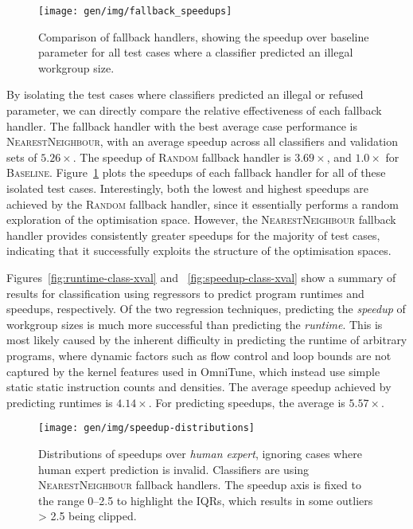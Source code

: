 \begin{figure}
\centering
\texttt{[image: gen/img/fallback\_speedups]}
\caption[Comparison of fallback handler speedups]{%
  Comparison of fallback handlers, showing the speedup over baseline
  parameter for all test cases where a classifier predicted an illegal
  workgroup size.%
}
\label{fig:fallback-speedups}
\end{figure}

By isolating the test cases where classifiers predicted an illegal or
refused parameter, we can directly compare the relative effectiveness
of each fallback handler. The fallback handler with the best average
case performance is \textsc{NearestNeighbour}, with an average speedup
across all classifiers and validation sets of $5.26\times$. The
speedup of \textsc{Random} fallback handler is $3.69\times$, and
$1.0\times$ for \textsc{Baseline}. Figure~\ref{fig:fallback-speedups}
plots the speedups of each fallback handler for all of these isolated
test cases. Interestingly, both the lowest and highest speedups are
achieved by the \textsc{Random} fallback handler, since it essentially
performs a random exploration of the optimisation space. However, the
\textsc{NearestNeighbour} fallback handler provides consistently
greater speedups for the majority of test cases, indicating that it
successfully exploits the structure of the optimisation spaces.

Figures~\ref{fig:runtime-class-xval} and ~\ref{fig:speedup-class-xval}
show a summary of results for classification using regressors to
predict program runtimes and speedups, respectively. Of the two
regression techniques, predicting the \emph{speedup} of workgroup
sizes is much more successful than predicting the \emph{runtime}. This
is most likely caused by the inherent difficulty in predicting the
runtime of arbitrary programs, where dynamic factors such as flow
control and loop bounds are not captured by the kernel features used
in OmniTune, which instead use simple static static instruction counts
and densities. The average speedup achieved by predicting runtimes is
$4.14\times$. For predicting speedups, the average is $5.57\times$.

\begin{figure}
\centering
\texttt{[image: gen/img/speedup-distributions]}
\caption[Speedup results over human expert]{%
  Distributions of speedups over \emph{human expert}, ignoring cases
  where human expert prediction is invalid. Classifiers are using
  \textsc{NearestNeighbour} fallback handlers. The speedup axis is
  fixed to the range 0--2.5 to highlight the IQRs, which results in
  some outliers > 2.5 being clipped.%
}
\label{fig:speedup-distributions}
\end{figure}

